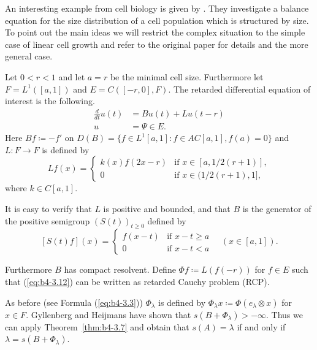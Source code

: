 \begin{example}\label{ex:b4-3.12}
	An interesting example from cell biology is given by \citet{gyllenbergheijmans:1985}. 
	They investigate a balance equation for the size distribution of a cell population which is structured by size. 
	To point out the main ideas we will restrict the complex situation to the simple case of linear cell growth and refer to the original paper for details and the more general case.
	
	Let $0 < r < 1$ and let $a = r$ be the minimal cell size. 
	Furthermore let $F = L^1([a,1])$ and $E = C([-r,0],F)$. 
	The retarded differential equation of interest is the following.
	\begin{equation}\label{eq:b4-3.12}
			\begin{aligned}
		\frac{d}{dt}u(t) &= Bu(t) + Lu(t-r)\\
		u &= \Psi \in E.
		\end{aligned}
	\end{equation}
%
%
%
%
\newpage
%
Here $Bf  \coloneq  -f'$ on $D(B) = \{f \in L^1[a,1] \colon f \in AC[a,1], f(a) = 0\}$ and $L : F \to F$ is defined by
\[
Lf(x) = 
\begin{cases}
	k(x)f(2x-r) & \text{if } x \in [a,1/2(r+1)] , \\
	0 & \text{if } x \in (1/2(r+1),1] ,
\end{cases}
\]
where $k \in C[a,1]$.

It is easy to verify that $L$ is positive and bounded, and that $B$ is the generator of the positive semigroup $(S(t))_{t\geq0}$ defined by
\[
[S(t)f](x) = 
\begin{cases}
	f(x-t) & \text{if } x-t \geq a \\
	0 & \text{if } x-t < a
\end{cases}
\quad (x \in [a,1]).
\]

Furthermore $B$ has compact resolvent. Define $\Phi f  \coloneq  L(f(-r))$ for $f \in E$ such that (\ref{eq:b4-3.12}) can be written as retarded Cauchy problem (RCP).

As before (see Formula (\ref{eq:b4-3.3})) $\Phi_{\lambda}$ is defined by $\Phi_{\lambda}x  \coloneq  \Phi(e_{\lambda}\otimes x)$ for $x \in F$. Gyllenberg and Heijmans have shown that $s(B + \Phi_{\lambda}) > -\infty$. Thus we can apply Theorem~\ref{thm:b4-3.7} and obtain that $s(A) = \lambda$ if and only if $\lambda = s(B + \Phi_{\lambda})$.
\end{example}

